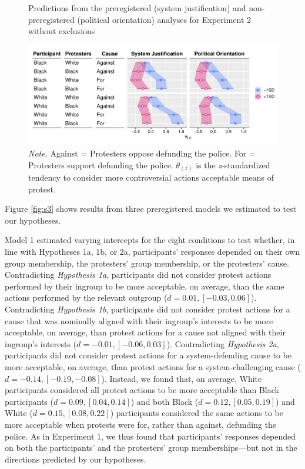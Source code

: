 \documentclass[12pt, letterpaper]{article}
\begin{document}
\begin{figure}[!t]
\centering
\caption{Predictions from the preregistered (system justification) and non-preregistered (political orientation) analyses for Experiment 2 without exclusions}
\includegraphics[scale=1]{../Experiment 2/figures/figure-s4}
\caption*{\textit{Note.} Against = Protesters oppose defunding the police. For = Protesters support defunding the police. $\theta_{(z)}$ is the \textit{z}-standardized tendency to consider more controversial actions acceptable means of protest.}
\label{fig:s4}
\end{figure}

Figure \ref{fig:s3} shows results from three preregistered models we
estimated to test our hypotheses.

Model 1 estimated varying intercepts for the eight conditions to test
whether, in line with Hypotheses 1a, 1b, or 2a, participants' responses
depended on their own group membership, the protesters' group
membership, or the protesters' cause. Contradicting \emph{Hypothesis
1a}, participants did not consider protest actions performed by their
ingroup to be more acceptable, on average, than the same actions
performed by the relevant outgroup (\(d = 0.01, [-0.03, 0.06]\)).
Contradicting \emph{Hypothesis 1b}, participants did not consider
protest actions for a cause that was nominally aligned with their
ingroup's interests to be more acceptable, on average, than protest
actions for a cause not aligned with their ingroup's interests
(\(d = -0.01, [-0.06, 0.03]\)). Contradicting \emph{Hypothesis 2a},
participants did not consider protest actions for a system-defending
cause to be more acceptable, on average, than protest actions for a
system-challenging cause (\(d = -0.14, [-0.19, -0.08]\)). Instead, we
found that, on average, White participants considered all protest
actions to be more acceptable than Black participants
(\(d = 0.09, [0.04, 0.14]\)) and both Black (\(d = 0.12, [0.05, 0.19]\))
and White (\(d = 0.15, [0.08, 0.22]\)) participants considered the same
actions to be more acceptable when protests were for, rather than
against, defunding the police. As in Experiment 1, we thus found that
participants' responses depended on both the participants' and the
protesters' group memberships---but not in the directions predicted by
our hypotheses.
\end{document}

